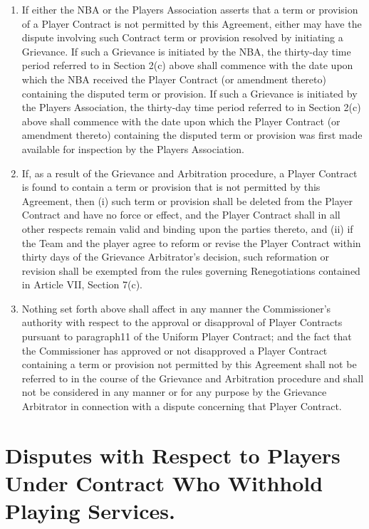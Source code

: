 \documentclass[
]{book}
\providecommand{\tightlist}{%
  \setlength{\itemsep}{0pt}\setlength{\parskip}{0pt}}
\begin{document}
\begin{enumerate}
\def\labelenumi{(\alph{enumi})}
\tightlist
\item
  If either the NBA or the Players Association asserts that a term or provision of a Player Contract is not permitted by this Agreement, either may have the dispute involving such Contract term or provision resolved by initiating a Grievance. If such a Grievance is initiated by the NBA, the thirty-day time period referred to in Section 2(c) above shall commence with the date upon which the NBA received the Player Contract (or amendment thereto) containing the disputed term or provision. If such a Grievance is initiated by the Players Association, the thirty-day time period referred to in Section 2(c) above shall commence with the date upon which the Player Contract (or amendment thereto) containing the disputed term or provision was first made available for inspection by the Players Association.
\item
  If, as a result of the Grievance and Arbitration procedure, a Player Contract is found to contain a term or provision that is not permitted by this Agreement, then (i) such term or provision shall be deleted from the Player Contract and have no force or effect, and the Player Contract shall in all other respects remain valid and binding upon the parties thereto, and (ii) if the Team and the player agree to reform or revise the Player Contract within thirty days of the Grievance Arbitrator's decision, such reformation or revision shall be exempted from the rules governing Renegotiations contained in Article VII, Section 7(c).
\item
  Nothing set forth above shall affect in any manner the Commissioner's authority with respect to the approval or disapproval of Player Contracts pursuant to paragraph11 of the Uniform Player Contract; and the fact that the Commissioner has approved or not disapproved a Player Contract containing a term or provision not permitted by this Agreement shall not be referred to in the course of the Grievance and Arbitration procedure and shall not be considered in any manner or for any purpose by the Grievance Arbitrator in connection with a dispute concerning that Player Contract.
\end{enumerate}

\hypertarget{disputes-with-respect-to-players-under-contract-who-withhold-playing-services.}{%
\section{Disputes with Respect to Players Under Contract Who Withhold Playing Services.}\label{disputes-with-respect-to-players-under-contract-who-withhold-playing-services.}}
\end{document}
